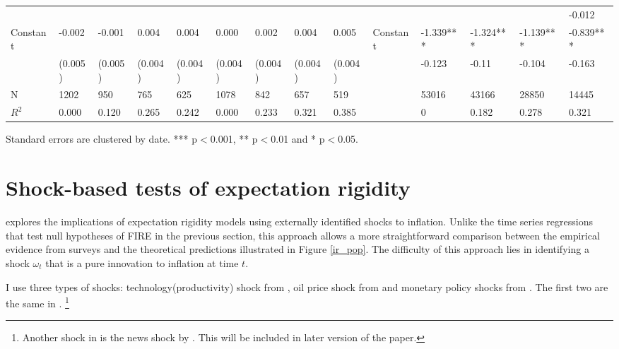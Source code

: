 \documentclass[12pt]{article}
\begin{document}
\begin{table}
\begin{adjustbox}{width={24cm},totalheight={14cm}}
\begin{threeparttable}
\begin{tabular}{llllllllllllll}
					&             &           &           &           &               &           &           &           &                      &               &           &           & -0.012    \\
					Constant               & -0.002      & -0.001    & 0.004     & 0.004     & 0.000         & 0.002     & 0.004     & 0.005     &   Constant                   & -1.339***     & -1.324*** & -1.139*** & -0.839*** \\
					& (0.005)     & (0.005)   & (0.004)   & (0.004)   & (0.004)       & (0.004)   & (0.004)   & (0.004)   &                      & -0.123        & -0.11     & -0.104    & -0.163    \\
					\hline 
					N                    & 1202        & 950       & 765       & 625       & 1078          & 842       & 657       & 519       &                      & 53016         & 43166     & 28850     & 14445     \\
					$R^2$ & 0.000       & 0.120     & 0.265     & 0.242     & 0.000         & 0.233     & 0.321     & 0.385     &                      & 0             & 0.182     & 0.278     & 0.321  \\
					\hline    
				\end{tabular}
				\begin{tablenotes}
					\item Standard errors are clustered by date. *** p$<$0.001, ** p$<$0.01 and * p$<$0.05.
				\end{tablenotes}
			\end{threeparttable}
		\end{adjustbox}
	\end{table}
	
	\section{Shock-based tests of expectation rigidity }\label{ShockBased}
	
	\citet{coibion2012can} explores the implications of expectation rigidity models using externally identified shocks to inflation.  Unlike the time series regressions that test null hypotheses of FIRE in the previous section, this approach allows a more straightforward comparison between the empirical evidence from surveys and the theoretical predictions illustrated in Figure \ref{ir_pop}. The difficulty of this approach lies in identifying a shock $\omega_t$ that is a pure innovation to inflation at time $t$. 
	
	I use three types of shocks: technology(productivity) shock from \citet{gali1999technology}, oil price shock from \citet{hamilton1996happened} and monetary policy shocks from  \citet{laseen2011anticipated}. The first two are the same in \citet{coibion2012can}. \footnote{ Another shock in \citet{coibon2012can} is the news shock by \citet{barsky2011news}. This will be included in later version of the paper.} 
	
\end{document}
